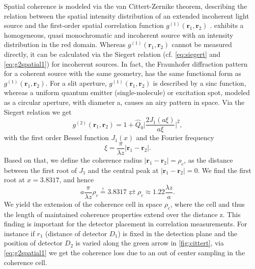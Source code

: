 \noindent Spatial coherence is modeled via the van Cittert-Zernike theorem, describing the relation between the spatial intensity distribution of an extended incoherent light source and the first-order spatial correlation function $g^{(1)}(\boldsymbol{r}_1, \boldsymbol{r}_2)$ \cite{van_cittert_wahrscheinliche_1934,zernike_concept_1938}.  exhibits a homogeneous, quasi monochromatic and incoherent source with an intensity distribution in the red domain. Whereas $g^{(1)}(\boldsymbol{r}_1, \boldsymbol{r}_2)$ cannot be measured directly, it can be calculated via the Siegert relation (cf. \cref{eq:siegert} and \cref{eq:g2spatial1}) for incoherent sources. In fact, the Fraunhofer diffraction pattern for a coherent source with the same geometry, has the same functional form as $g^{(1)}(\boldsymbol{r}_1, \boldsymbol{r}_2)$. For a slit aperture, $g^{(1)}(\boldsymbol{r}_1, \boldsymbol{r}_2)$ is described by a sinc function, whereas a uniform quantum emitter (single-molecule) or excitation spot, modeled as a circular aperture, with diameter a, causes an airy pattern in space. Via the Siegert relation we get
\begin{equation}\label{eq:g2spatial1}
	g^{(2)}(\boldsymbol{r}_1, \boldsymbol{r}_2)=1+\hat{Q}_0\Big|\dfrac{2J_1(a\xi)}{a\xi}\Big|^2,
\end{equation}
with the first order Bessel function $J_1(x)$ and the Fourier frequency
\begin{equation}\label{eq:g2spatial2}
	\xi=\dfrac{\pi}{\lambda z}|\boldsymbol{r}_1-\boldsymbol{r}_2|.
\end{equation}
Based on that, we define the coherence radius $|\boldsymbol{r}_1-\boldsymbol{r}_2|=\rho_c$, as the distance between the first root of $J_1$ and the central peak at $|\boldsymbol{r}_1-\boldsymbol{r}_2|=0$. We find the first root at $x =3.8317$, and hence
\begin{equation}\label{eq:g2spatial3}
	a\dfrac{\pi}{\lambda z}\rho_c\stackrel{!}{=}3.8317 \rightleftarrows \rho_c\approx 1.22\dfrac{\lambda z}{a}.
\end{equation}
We yield the extension of the coherence cell in space $\rho_c$, where the cell and thus the length of maintained coherence properties extend over the distance z. This finding is important for the detector placement in correlation measurements. For instance if ${r}_1$ (distance of detector $D_1$) is fixed in the detection plane and the position of detector $D_2$ is varied along the green arrow in \cref{fig:cittert}, via \cref{eq:g2spatial1} we get the coherence loss due to an out of center sampling in the coherence cell.

